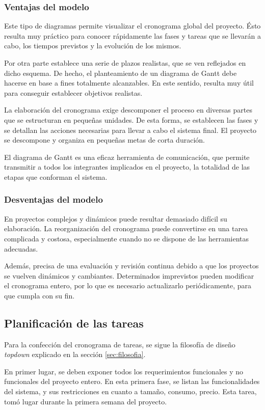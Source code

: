 \subsubsection{Ventajas del modelo}
Este tipo de diagramas permite visualizar el cronograma global del proyecto. 
Ésto resulta muy práctico para conocer rápidamente las fases y tareas que se llevarán a cabo, los tiempos previstos y la evolución de los mismos.

Por otra parte establece una serie de plazos realistas, que se ven reflejados en dicho esquema.
De hecho, el planteamiento de un diagrama de Gantt debe hacerse en base a fines totalmente alcanzables.
En este sentido, resulta muy útil para conseguir establecer objetivos realistas.

La elaboración del cronograma exige descomponer el proceso en diversas partes que se estructuran en pequeñas unidades. De esta forma, se establecen las fases y se detallan las acciones necesarias para llevar a cabo el sistema final. El proyecto se descompone y organiza en pequeñas metas de corta duración.

El diagrama de Gantt es una eficaz herramienta de comunicación, que permite transmitir a todos los integrantes implicados en el proyecto, la totalidad de las etapas que conforman el sistema.

\subsubsection{Desventajas del modelo}
En proyectos complejos y dinámicos puede resultar demasiado difícil su elaboración. La reorganización del cronograma puede convertirse en una tarea complicada y costosa, especialmente cuando no se dispone de las herramientas adecuadas.

Además, precisa de una evaluación y revisión continua debido a que los proyectos se vuelven dinámicos y cambiantes. Determinados imprevistos pueden modificar el cronograma entero, por lo que es necesario actualizarlo periódicamente, para que cumpla con su fin.

\subsection{Planificación de las tareas}

Para la confección del cronograma de tareas, se sigue la filosofía de diseño \emph{topdown} explicado en la sección \ref{sec:filosofia}.

En primer lugar, se deben exponer todos los requerimientos funcionales y no funcionales del proyecto entero.
En esta primera fase, se listan las funcionalidades del sistema, y sus restricciones en cuanto a tamaño, consumo, precio.
Esta tarea, tomó lugar durante la primera semana del proyecto.

